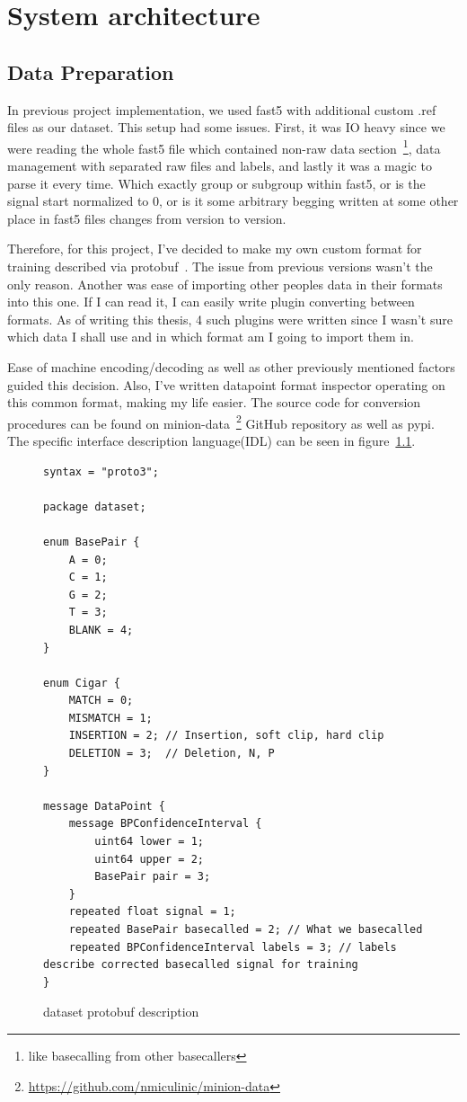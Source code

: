 \documentclass[times, utf8, diplomski, english]{fer}
\begin{document}
\chapter{System architecture}
\label{chap:system_arhitecture}
\section{Data Preparation}
\label{sec:data_preparation}
In previous project implementation, we used fast5 with additional custom .ref files as our dataset. This setup had some issues. First, it was IO heavy since we were reading the whole fast5 file which contained non-raw data section~\footnote{like basecalling from other basecallers}, data management with separated raw files and labels, and lastly it was a magic to parse it every time. Which exactly group or subgroup within fast5, or is the signal start normalized to 0, or is it some arbitrary begging written at some other place in fast5 files changes from version to version. 

Therefore, for this project, I've decided to make my own custom format for training described via protobuf~\citep{protobuf}. The issue from previous versions wasn't the only reason. Another was ease of importing other peoples data in their formats into this one. If I can read it, I can easily write plugin converting between formats. As of writing this thesis, 4 such plugins were written since I wasn't sure which data I shall use and in which format am I going to import them in. 

Ease of machine encoding/decoding as well as other previously mentioned factors guided this decision. Also, I've written datapoint format inspector operating on this common format, making my life easier. The source code for conversion procedures can be found on minion-data~\footnote{\url{https://github.com/nmiculinic/minion-data}} GitHub repository as well as pypi. The specific interface description language(IDL) can be seen in figure~\ref{fg:dataset_proto}.


\begin{figure}
    \begin{center}
    \begin{lstlisting}[language=protobuf3,style=protobuf]
syntax = "proto3";

package dataset;

enum BasePair {
    A = 0;
    C = 1;
    G = 2;
    T = 3;
    BLANK = 4;
}

enum Cigar {
    MATCH = 0;
    MISMATCH = 1;
    INSERTION = 2; // Insertion, soft clip, hard clip
    DELETION = 3;  // Deletion, N, P
}

message DataPoint {
    message BPConfidenceInterval {
        uint64 lower = 1;
        uint64 upper = 2;
        BasePair pair = 3;
    }
    repeated float signal = 1;
    repeated BasePair basecalled = 2; // What we basecalled
    repeated BPConfidenceInterval labels = 3; // labels describe corrected basecalled signal for training
}
    \end{lstlisting}
    \caption{dataset protobuf description}
    \label{fg:dataset_proto}
    \end{center}
\end{figure}
\end{document}
